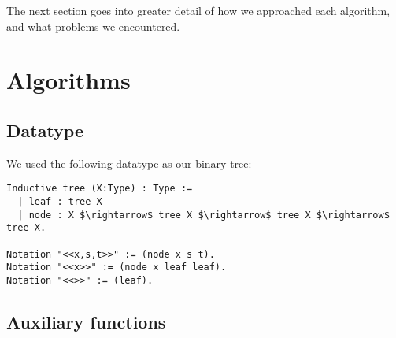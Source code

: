 \documentclass[a4paper,10pt]{article}
\begin{document}
The next section goes into greater detail of how we approached each algorithm, and what problems we encountered.

\section{Algorithms}\label{algorithms}

\subsection{Datatype}
We used the following datatype as our binary tree:

\begin{lstlisting}[mathescape=true]
Inductive tree (X:Type) : Type :=
  | leaf : tree X
  | node : X $\rightarrow$ tree X $\rightarrow$ tree X $\rightarrow$ tree X.

Notation "<<x,s,t>>" := (node x s t).
Notation "<<x>>" := (node x leaf leaf).
Notation "<<>>" := (leaf).
\end{lstlisting}

\subsection{Auxiliary functions}
\end{document}
